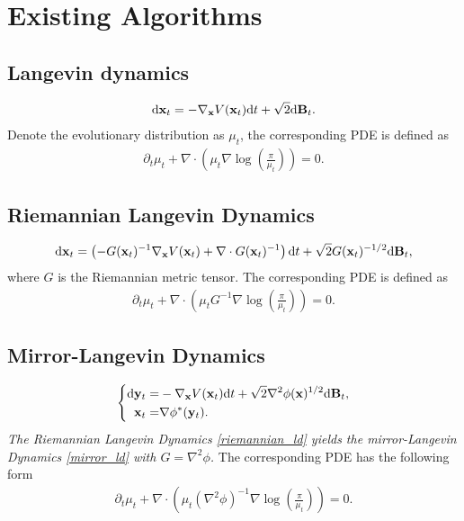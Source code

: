 \section{Existing Algorithms}
\subsection{Langevin dynamics}
\begin{align}
	\mathrm{d} \mathbf{x}_t = -\nabla_{\mathbf{x}} V(\mathbf{x}_t) \mathrm{d} t + \sqrt{2}\mathrm{d} \mathbf{B}_t.
\end{align}
Denote the evolutionary distribution as $\mu_t$, the corresponding PDE is defined as 
\begin{align}
	\partial_t\mu_t + \nabla\cdot(\mu_t \nabla\log(\frac{\pi}{\mu_t})) = 0.
\end{align}

\subsection{Riemannian Langevin Dynamics} 
\begin{align}\label{riemannian_ld}
	\mathrm{d} \mathbf{x}_t = \left( -G(\mathbf{x}_t)^{-1}\nabla_{\mathbf{x}}V(\mathbf{x}_t) + \nabla\cdot G(\mathbf{x}_t)^{-1} \right)\mathrm{d} t + \sqrt{2}G(\mathbf{x}_t)^{-1/2}\mathrm{d} \mathbf{B}_t, 
\end{align}
where $G$ is the Riemannian metric tensor. The corresponding PDE is defined as \cite{ma2015complete}
\begin{align}
	\partial_t \mu_t + \nabla\cdot (\mu_t G^{-1}\nabla\log(\frac{\pi}{\mu_t})) = 0.
\end{align}

\subsection{Mirror-Langevin Dynamics}
\cite{zhang2020wasserstein,ahn2020efficient,chewi2020exponential,jiangmirror,li2021mirror}
\begin{align}\label{mirror_ld}
	\left\{
	\begin{aligned}
		\mathrm{d} \mathbf{y}_t = & -\nabla_{\mathbf{x}} V(\mathbf{x}_t) \mathrm{d} t + \sqrt{2}\nabla^2\phi(\mathbf{x})^{1/2}\mathrm{d} \mathbf{B}_t, \\
		\mathbf{x}_t =& \nabla\phi^*(\mathbf{y}_t).
	\end{aligned}
	\right.
\end{align}
\emph{The Riemannian Langevin Dynamics \eqref{riemannian_ld} yields the mirror-Langevin Dynamics \eqref{mirror_ld} with $G = \nabla^2\phi$.}
The corresponding PDE has the following form \cite{chewi2020exponential}
\begin{align}
	\partial_t \mu_t + \nabla\cdot (\mu_t (\nabla^2\phi)^{-1}\nabla\log(\frac{\pi}{\mu_t})) = 0.
\end{align}


